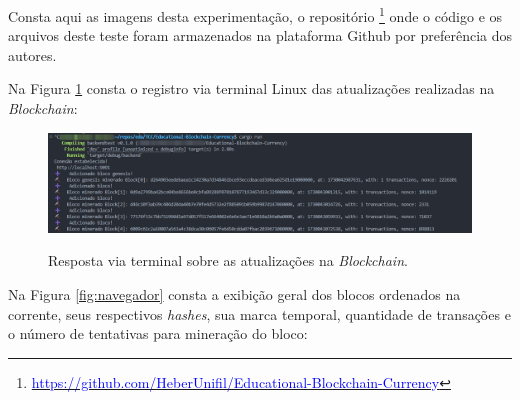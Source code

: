 \documentclass[article,12pt,oneside,a4paper,english,brazil]{unifil}
\begin{document}
\begin{Spacing}{1.5}
\begin{itemize}
\end{itemize}


Consta aqui as imagens desta experimentação, o repositório \footnote{\href{https://github.com/HeberUnifil/Educational-Blockchain-Currency}{\textcolor{blue}{https://github.com/HeberUnifil/Educational-Blockchain-Currency}}} onde o código e os arquivos deste teste foram armazenados na plataforma Github por preferência dos autores.

Na Figura \ref*{fig:terminal} consta o registro via terminal Linux das atualizações realizadas na \textit{Blockchain}:

\begin{figure} [h]
	\centering
	\caption{Resposta via terminal sobre as atualizações na \textit{Blockchain}.}
	\includegraphics[width=1\linewidth]{../images/terminal-blockchain.png}
	\label{fig:terminal}

\end{figure}

Na Figura \ref*{fig:navegador} consta a exibição geral dos blocos ordenados na corrente, seus respectivos \textit{hashes}, sua marca temporal, quantidade de transações e o número de tentativas para mineração do bloco:


\end{Spacing}
\end{document}
